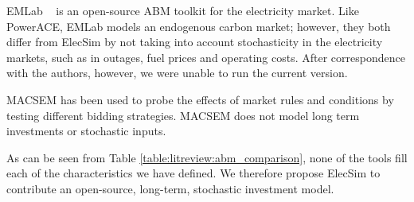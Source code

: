 EMLab ~\cite{Chappin2017} is an open-source ABM toolkit for the electricity market. Like PowerACE, EMLab models an endogenous carbon market; however, they both differ from ElecSim by not taking into account stochasticity in the electricity markets, such as in outages, fuel prices and operating costs. After correspondence with the authors, however, we were unable to run the current version.

MACSEM \cite{Praca2003} has been used to probe the effects of market rules and conditions by testing different bidding strategies. MACSEM does not model long term investments or stochastic inputs.


As can be seen from Table \ref{table:litreview:abm_comparison}, none of the tools fill each of the characteristics we have defined. We therefore propose ElecSim to contribute an open-source, long-term, stochastic investment model. 

